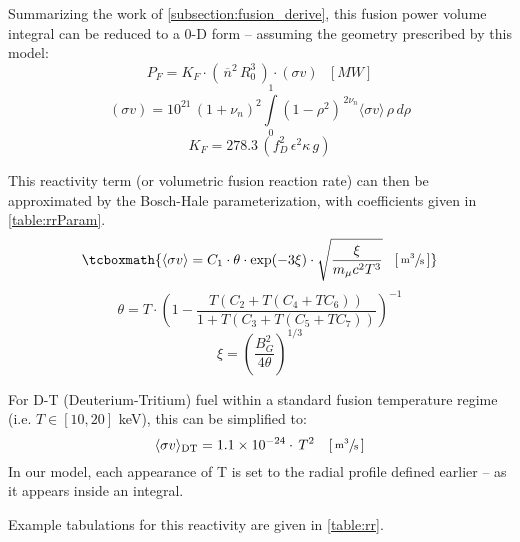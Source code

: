 Summarizing the work of \cref{subsection:fusion_derive}, this fusion power volume integral can be reduced to a 0-D form -- assuming the geometry prescribed by this model:
\begin{equation}
	P_F = K_F \cdot ( \, \overline{n}^2 \, R_0^3 \, ) \cdot (\sigma v) \ \ \ [MW]
\end{equation}
\begin{equation}
	 (\sigma v) = 10^{21} \, (1+\nu_n)^2 \int\limits_0^1 ( 1 - \rho^2 ) ^ { \, 2 \nu_n} \langle \sigma v \rangle \, \rho \, d\rho
\end{equation}
\begin{equation}
	K_F = 278.3 \, ( f_D^2 \, \epsilon^2 \kappa \, g )
\end{equation}

This reactivity term (or volumetric fusion reaction rate) can then be approximated by the Bosch-Hale parameterization, with coefficients given in \cref{table:rrParam}.\cite{boschhale,zach}
\begin{equation}
	\tcboxmath{
	\langle \sigma v \rangle = C_1 \cdot \theta \cdot \textnormal{exp}(-3 \xi) \cdot \sqrt{ \frac{\xi  }{m_\mu  c^2 T^3} }  \ \ \, [ \, \sfrac{ \textnormal{m}^3 }{ \textnormal{s} } \, ] }
\end{equation}
\begin{equation} 
	\theta = T \cdot \left(1-\frac{T(C_2+T(C_4+TC_6))}{1+T(C_3+T(C_5+TC_7))}\right) ^{-1}
\end{equation}
\begin{equation}
	\xi = \left(\frac{B_G^2}{4\theta}\right)^{1/3}
\end{equation}

For D-T (Deuterium-Tritium) fuel within a standard fusion temperature regime (i.e. $T \in [10, 20]$ keV), this can be simplified to:\cite{zach} 
\begin{equation}
		\langle\sigma v\rangle_\mathrm{DT} = 1.1\times10^{-24} \cdot  \, T^2   \ \ \ [ \, \sfrac{ \textnormal{m}^3 }{ \textnormal{s} } \, ]
\end{equation}
In our model, each appearance of T is set to the radial profile defined earlier -- as it appears inside an integral.

Example tabulations for this reactivity are given in \cref{table:rr}.\cite{zach,nrl,boschhale}

